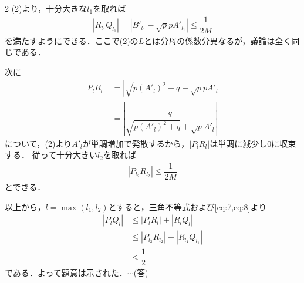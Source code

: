 \documentclass[../../main.tex]{subfiles}
\begin{document}
\begin{multicols}{2}
  (2)より，十分大きな$l_1$を取れば
  \begin{align}
    |R_{l_1}Q_{l_1}| = |B'_{l_1}-\sqrt{p} p A'_{l_1}| \le \dfrac{1}{2M} \label{eq:7}
  \end{align}
  を満たすようにできる．ここで(2)の$L$とは分母の係数分異なるが，議論は全く同じである．

  次に
  \begin{align}
    |P_{l}R_{l}|
    & = |\sqrt{p \left(A'_{l}\right)^{2}+q}-\sqrt{p} p A'_{l}|           \\
    & = |\dfrac{q}{\sqrt{p \left(A'_{l}\right)^{2}+q} + \sqrt{p} A'_{l}}|
  \end{align}
  について，(2)より$A'_{l}$が単調増加で発散するから，$|P_{l}R_{l}|$は単調に減少し$0$に収束する．
  従って十分大きい$l_2$を取れば
  \begin{align}
    |P_{l_2}R_{l_2}| \le \dfrac{1}{2M} \label{eq:8}
  \end{align}
  とできる．

  以上から，$l=\max(l_1,l_2)$とすると，三角不等式および\cref{eq:7,eq:8}より
  \begin{align}
    |P_{l}Q_{l}|
    & \le |P_{l}R_{l}| + |R_{l}Q_{l}|         \\
    & \le |P_{l_2}R_{l_2}| + |R_{l_1}Q_{l_1}| \\
    & \le \dfrac{1}{2}
  \end{align}
  である．よって題意は示された．$\cdots$(答)


\end{multicols}
\end{document}
